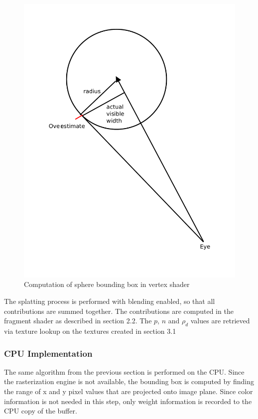 \documentclass[10pt,twopage]{acmsiggraph}
\begin{document}
\begin{figure}[htbp]
\begin{center}
\includegraphics[scale = .5]{splatEye.pdf}
\caption{Computation of sphere bounding box in vertex shader}
\label{boundingBox}
\end{center}
\end{figure}

The splatting process is performed with blending enabled, so that all contributions are summed together.  The contributions are computed in the fragment shader as described in section 2.2.  The $p$, $n$ and $\rho_d$ values are retrieved via texture lookup on the textures created in section 3.1 

\subsubsection{CPU Implementation}
The same algorithm from the previous section is performed on the CPU.  Since the rasterization engine is not available, the bounding box is computed by finding the range of x and y pixel values that are projected onto image plane.  Since color information is not needed in this step, only weight information is recorded to the CPU copy of the buffer.
\end{document}
